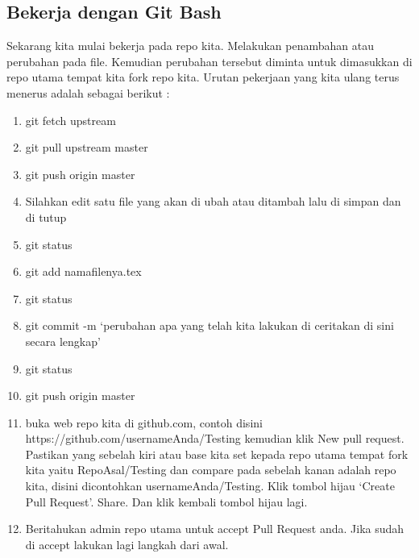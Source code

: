 \subsection{Bekerja dengan Git Bash}
Sekarang kita mulai bekerja pada repo kita. Melakukan penambahan atau perubahan pada file. Kemudian perubahan tersebut diminta untuk dimasukkan di repo utama tempat kita fork repo kita. Urutan pekerjaan yang kita ulang terus menerus adalah sebagai berikut :
\begin{enumerate}
\item git fetch upstream
\item git pull upstream master
\item git push origin master
\item Silahkan edit satu file yang akan di ubah atau ditambah lalu di simpan dan di tutup
\item git status
\item git add namafilenya.tex
\item git status
\item git commit -m `perubahan apa yang telah kita lakukan di ceritakan di sini secara lengkap'
\item git status
\item git push origin master
\item buka web repo kita di github.com, contoh disini https://github.com/usernameAnda/Testing kemudian klik New pull request. Pastikan yang sebelah kiri atau base kita set kepada repo utama tempat fork kita yaitu RepoAsal/Testing dan compare pada sebelah kanan adalah repo kita, disini dicontohkan usernameAnda/Testing. Klik tombol hijau `Create Pull Request'. Share. Dan klik kembali tombol hijau lagi.
\item Beritahukan admin repo utama untuk accept Pull Request anda. Jika sudah di accept lakukan lagi langkah dari awal.
\end{enumerate}
